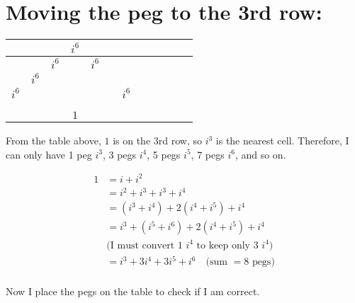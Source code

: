\documentclass[12pt]{article}
\begin{document}
\section{Moving the peg to the 3rd row:}
\begin{tabular}{|l|c|c|c|c|c|c|c|c|c|c|r|}
    \hline
    & & & $i^6$ & & & \\
    \hline
    & & $i^6$ & \color{blue}{$i^5$} & $i^6$ & & \\
    \hline
    & $i^6$ & \color{blue}{$i^5$} & \color{black}{$i^4$} & \color{blue}{$i^5$} & \color{black}{$i^6$} & \\
    \hline
    $i^6$ & \color{blue}{$i^5$} & \color{black}{$i^4$} & \color{blue}{$i^3$} & \color{black}{$i^4$} & \color{blue}{$i^5$} & $i^6$ \\
    \hline
    & & & & & &\\
    \hline
    & & & & & &\\
    \hline
    & & & $1$ & & &\\
    \hline
\end{tabular}

\noindent From the table above, $1$ is on the 3rd row, so $i^3$ is the nearest cell. Therefore, I can only have 1 peg $i^3$, 3 pegs $i^4$, 5 pegs $i^5$, 7 pegs $i^6$, and so on.

\begin{align*}
    1&=i+i^2\\
    &= i^2+i^3+i^3+i^4\\
    &= \left(i^3+i^4\right)+2\left(i^4+i^5\right)+i^4\\
    &=i^3+ \left(i^5+i^6\right)+2\left(i^4+i^5\right)+i^4\\
    &\text{(I must convert 1 $i^4$ to keep only 3 $i^4$)}\\
    &=i^3+ 3i^4+ 3i^5+ i^6 \quad\text{(sum $=8$ pegs)}\\
\end{align*}

Now I place the pegs on the table to check if I am correct.
\end{document}
